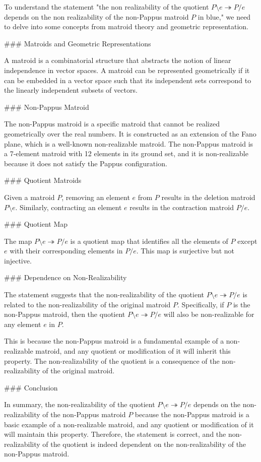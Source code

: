 To understand the statement "the non realizability of the quotient \( P \setminus e \twoheadrightarrow P / e \) depends on the non realizability of the non-Pappus matroid \( P \) in blue," we need to delve into some concepts from matroid theory and geometric representation.

### Matroids and Geometric Representations

A matroid is a combinatorial structure that abstracts the notion of linear independence in vector spaces. A matroid can be represented geometrically if it can be embedded in a vector space such that its independent sets correspond to the linearly independent subsets of vectors.

### Non-Pappus Matroid

The non-Pappus matroid is a specific matroid that cannot be realized geometrically over the real numbers. It is constructed as an extension of the Fano plane, which is a well-known non-realizable matroid. The non-Pappus matroid is a 7-element matroid with 12 elements in its ground set, and it is non-realizable because it does not satisfy the Pappus configuration.

### Quotient Matroids

Given a matroid \( P \), removing an element \( e \) from \( P \) results in the deletion matroid \( P \setminus e \). Similarly, contracting an element \( e \) results in the contraction matroid \( P / e \).

### Quotient Map

The map \( P \setminus e \twoheadrightarrow P / e \) is a quotient map that identifies all the elements of \( P \) except \( e \) with their corresponding elements in \( P / e \). This map is surjective but not injective.

### Dependence on Non-Realizability

The statement suggests that the non-realizability of the quotient \( P \setminus e \twoheadrightarrow P / e \) is related to the non-realizability of the original matroid \( P \). Specifically, if \( P \) is the non-Pappus matroid, then the quotient \( P \setminus e \twoheadrightarrow P / e \) will also be non-realizable for any element \( e \) in \( P \).

This is because the non-Pappus matroid is a fundamental example of a non-realizable matroid, and any quotient or modification of it will inherit this property. The non-realizability of the quotient is a consequence of the non-realizability of the original matroid.

### Conclusion

In summary, the non-realizability of the quotient \( P \setminus e \twoheadrightarrow P / e \) depends on the non-realizability of the non-Pappus matroid \( P \) because the non-Pappus matroid is a basic example of a non-realizable matroid, and any quotient or modification of it will maintain this property. Therefore, the statement is correct, and the non-realizability of the quotient is indeed dependent on the non-realizability of the non-Pappus matroid.